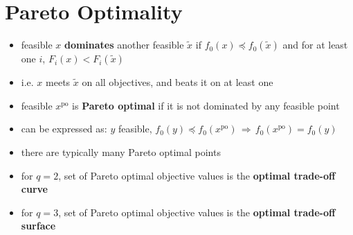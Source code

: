 \documentclass[11pt]{extarticle}
\newcommand{\ds}{\displaystyle}
\newcommand{\ie}{\,\Longrightarrow\,}
\theoremstyle{definition}
\begin{document}
\newpage

\section*{Pareto Optimality}

\begin{itemize}
  \item feasible $x$ {\bf dominates} another feasible $\widetilde{x}$ if $\ds f_0(x)\preccurlyeq f_0(\widetilde{x})$ and for at least one $i$, $\ds F_i(x) < F_i(\widetilde{x})$
  \item i.e. $x$ meets $\widetilde{x}$ on all objectives, and beats it on at least one
  \item feasible $\ds x^{\text{po}}$ is {\bf Pareto optimal} if it is not dominated by any feasible point
  \item can be expressed as: $y$ feasible, $\ds f_0(y)\preccurlyeq f_0(x^{\text{po}}) \ie f_0(x^{\text{po}}) = f_0(y)$
  \item there are typically many Pareto optimal points
  \item for $q = 2$, set of Pareto optimal objective values is the {\bf optimal trade-off curve}
  \item for $q = 3$, set of Pareto optimal objective values is the {\bf optimal trade-off surface}
\end{itemize}

\newpage
\end{document}
